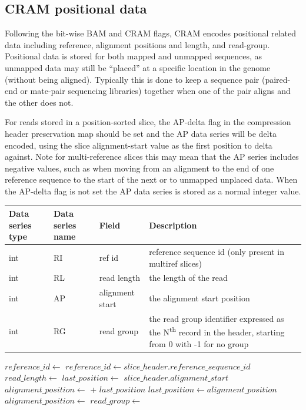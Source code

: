 \documentclass[a4paper]{article}
\begin{document}
\subsection{\textbf{CRAM positional data}}
\label{subsec:positions}

Following the bit-wise BAM and CRAM flags, CRAM encodes positional related data including reference, alignment positions and length, and read-group.
Positional data is stored for both mapped and unmapped sequences, as unmapped data may still be ``placed'' at a specific location in the genome (without being aligned).
Typically this is done to keep a sequence pair (paired-end or mate-pair sequencing libraries) together when one of the pair aligns and the other does not.

For reads stored in a position-sorted slice, the AP-delta flag in the compression header preservation map should be set and the AP data series will be delta encoded, using the slice alignment-start value as the first position to delta against.
Note for multi-reference slices this may mean that the AP series includes negative values, such as when moving from an alignment to the end of one reference sequence to the start of the next or to unmapped unplaced data.  When the AP-delta flag is not set the AP data series is stored as a normal integer value.

\begin{tabular}{|>{\raggedright}p{70pt}|>{\raggedright}p{75pt}|>{\raggedright}p{90pt}|>{\raggedright}p{171pt}|}
\hline
\textbf{Data series type} & \textbf{Data series name} & \textbf{Field} & \textbf{Description}\tabularnewline
\hline
int & RI & ref id & reference sequence id (only present in multiref slices)\tabularnewline
\hline
int & RL & read length & the length of the read\tabularnewline
\hline
int & AP & alignment start & the alignment start position\tabularnewline
\hline
int & RG & read group & the read group identifier expressed as the N\textsuperscript{th} record in the header, starting from 0 with -1 for no group\tabularnewline
\hline
\end{tabular}

\vskip 20pt
\begin{algorithmic}[1]
  \State $reference\_id\gets$ 
\Else
  \State $reference\_id\gets slice\_header.reference\_sequence\_id$
\EndIf
\State $read\_length \gets$ 
        \State $last\_position\gets$ $slice\_header.alignment\_start$
    \EndIf
    \State $alignment\_position \gets$  + $last\_position$
    \State $last\_position \gets alignment\_position$
\Else
    \State $alignment\_position \gets$ 
\EndIf
\State $read\_group \gets$ 
\EndProcedure
\end{algorithmic}
\end{document}
